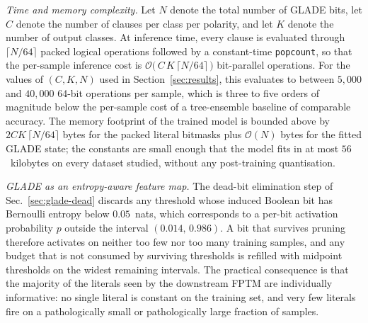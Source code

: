 \documentclass[journal,10pt]{IEEEtran}
\begin{document}
\emph{Time and memory complexity.} Let $N$ denote the total number
of GLADE bits, let $C$ denote the number of clauses per class per
polarity, and let $K$ denote the number of output classes. At
inference time, every clause is evaluated through
$\lceil N/64 \rceil$ packed logical operations followed by a
constant-time \texttt{popcount}, so that the per-sample inference
cost is
$
  \mathcal{O}\!\bigl(\,C\,K\,\lceil N/64 \rceil\,\bigr)
$
bit-parallel operations. For the values of $(C,K,N)$ used in
Section~\ref{sec:results}, this evaluates to between $5{,}000$ and
$40{,}000$ 64-bit operations per sample, which is three to five
orders of magnitude below the per-sample cost of a tree-ensemble
baseline of comparable accuracy. The memory footprint of the
trained model is bounded above by $2CK\,\lceil N/64 \rceil$ bytes
for the packed literal bitmasks plus $\mathcal{O}(N)$ bytes for the
fitted GLADE state; the constants are small enough that the model
fits in at most $56$~kilobytes on every dataset studied, without any
post-training quantisation.

\emph{GLADE as an entropy-aware feature map.} The dead-bit
elimination step of Sec.~\ref{sec:glade-dead} discards any
threshold whose induced Boolean bit has Bernoulli entropy below
$0.05$~nats, which corresponds to a per-bit activation probability
$p$ outside the interval $(0.014,\,0.986)$. A bit that survives
pruning therefore activates on neither too few nor too many
training samples, and any budget that is not consumed by surviving
thresholds is refilled with midpoint thresholds on the widest
remaining intervals. The practical consequence is that the
majority of the literals seen by the downstream FPTM are
individually informative: no single literal is constant on the
training set, and very few literals fire on a pathologically
small or pathologically large fraction of samples.
\end{document}

